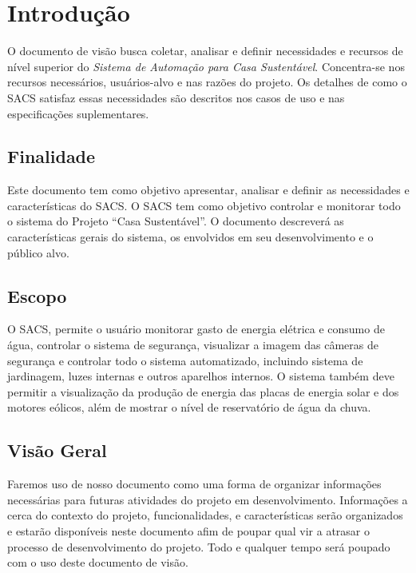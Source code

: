 \section{Introdução}

	O documento de visão busca coletar, analisar e definir necessidades e recursos de nível superior do \textit{Sistema de Automação para Casa Sustentável}. Concentra-se nos recursos necessários, usuários-alvo e nas razões do projeto. Os detalhes de como o SACS satisfaz essas necessidades são descritos nos casos de uso e nas especificações suplementares.

\subsection{Finalidade}

	Este documento tem como objetivo apresentar, analisar e definir as necessidades e características do SACS. O SACS tem como objetivo controlar e monitorar todo o sistema do Projeto “Casa Sustentável”. O documento descreverá as características gerais do sistema, os envolvidos em seu desenvolvimento e o público alvo.


\subsection{Escopo}

	O SACS, permite o usuário monitorar gasto de energia elétrica e consumo de água, controlar o sistema de segurança, visualizar a imagem das câmeras de segurança e controlar todo o sistema automatizado, incluindo sistema de jardinagem, luzes internas e outros aparelhos internos. O sistema também deve permitir a visualização da produção de energia das placas de energia solar e dos motores eólicos, além de mostrar o nível de reservatório de água da chuva.

\subsection{Visão Geral}

	Faremos uso de nosso documento como uma forma de organizar informações necessárias para futuras atividades do projeto em desenvolvimento. Informações a cerca do contexto do projeto, funcionalidades, e características serão organizados e estarão disponíveis neste documento afim de poupar qual vir a atrasar o processo de desenvolvimento do projeto. Todo e qualquer tempo será poupado com o uso deste documento de visão.


